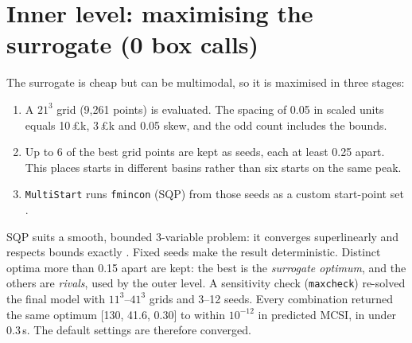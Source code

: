 \documentclass[11pt,a4paper]{article}
\begin{document}
\section{Inner level: maximising the surrogate (0 box calls)}
The surrogate is cheap but can be multimodal, so it is maximised in three stages:
\begin{enumerate}
\setlength{\itemsep}{0pt}
\item A $21^3$ grid (9{,}261 points) is evaluated. The spacing of 0.05 in scaled units equals 10\,\pounds k, 3\,\pounds k and 0.05 skew, and the odd count includes the bounds.
\item Up to 6 of the best grid points are kept as seeds, each at least 0.25 apart. This places starts in different basins rather than six starts on the same peak.
\item \texttt{MultiStart} runs \texttt{fmincon} (SQP) from those seeds as a custom start-point set \cite{MathWorksMS}.
\end{enumerate}
SQP suits a smooth, bounded 3-variable problem: it converges superlinearly and respects bounds exactly \cite{Nocedal2006}.
Fixed seeds make the result deterministic.
Distinct optima more than 0.15 apart are kept: the best is the \emph{surrogate optimum}, and the others are \emph{rivals}, used by the outer level.
A sensitivity check (\texttt{maxcheck}) re-solved the final model with $11^3$--$41^3$ grids and 3--12 seeds.
Every combination returned the same optimum [130, 41.6, 0.30] to within $10^{-12}$ in predicted MCSI, in under 0.3\,s.
The default settings are therefore converged.

\end{document}
